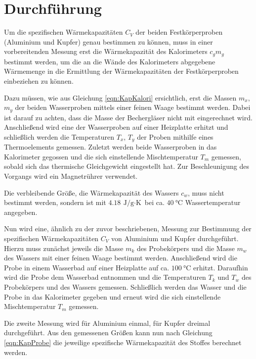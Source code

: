 \section{Durchführung}
\label{sec:Durchführung}

Um die spezifischen Wärmekapazitäten $C_V$ der beiden Festkörperproben 
(Aluminium und Kupfer) genau bestimmen zu können, muss in einer 
vorbereitenden Messung erst die Wärmekapazität des Kalorimeters $c_gm_g$ 
bestimmt werden, um die an die Wände des Kalorimeters abgegebene Wärmemenge 
in die Ermittlung der Wärmekapazitäten der Festkörperproben einbeziehen zu 
können.

Dazu müssen, wie aus Gleichung \ref{eqn:KapKalori} ersichtlich,
erst die Massen $m_x$, $m_y$ der beiden Wasserproben mittels einer 
feinen Waage bestimmt werden. Dabei ist darauf zu achten, dass die 
Masse der Bechergläser nicht mit eingerechnet wird. Anschließend wird eine 
der Wasserproben auf einer Heizplatte erhitzt und schließlich werden die
Temperaturen $T_x$, $T_y$ der Proben mithilfe eines Thermoelements gemessen.
Zuletzt werden beide Wasserproben in das Kalorimeter gegossen und die sich 
einstellende Mischtemperatur $T_m$ gemessen, sobald sich das thermische 
Gleichgewicht eingestellt hat. Zur Beschleunigung des Vorgangs wird ein 
Magnetrührer verwendet.

Die verbleibende Größe, die Wärmekapazität des Wassers $c_w$, muss nicht 
bestimmt werden, sondern ist mit $\SI{4.18}{\joule\per\gram\cdot\kelvin}$ 
bei ca. $\SI{40}{\celsius}$ Wassertemperatur angegeben.


Nun wird eine, ähnlich zu der zuvor beschriebenen, Messung zur Bestimmung
der spezifischen Wärmekapazitäten $C_V$ von Aluminium und Kupfer durchgeführt. 
Hierzu muss zunächst jeweils die Masse $m_k$ des Probekörpers und die Masse $m_w$ 
des Wassers mit einer feinen Waage bestimmt werden. Anschließend wird die Probe 
in einem Wasserbad auf einer Heizplatte auf ca. $\SI{100}{\celsius}$ erhitzt. 
Daraufhin wird die Probe dem Wasserbad entnommen und die Temperaturen $T_k$
und $T_w$ des Probekörpers und des Wassers gemessen.
Schließlich werden das Wasser und die Probe in das Kalorimeter gegeben und 
erneut wird die sich einstellende Mischtemperatur $T_m$ gemessen.

Die zweite Messung wird für Aluminium einmal, für Kupfer dreimal durchgeführt. 
Aus den gemessenen Größen kann nun nach Gleichung \ref{eqn:KapProbe} die 
jeweilige spezifische Wärmekapazität des Stoffes berechnet werden.









